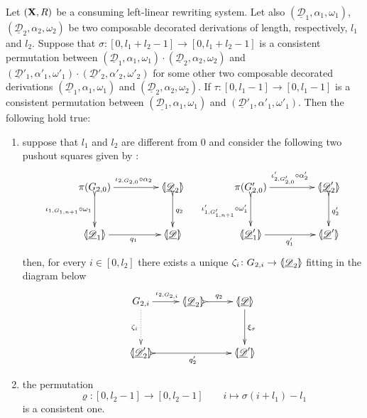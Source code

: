 \documentclass[a4paper,UKenglish,cleveref,pdftex,thm-restate,numberwithinsect]{lipics-v2021}
\def\R{\mathsf{R}}
\def\X{\textbf {\textup{X}}}
\newcommand{\dder}[1]{\mathscr{#1}}
\newcommand{\der}[1]{\underline{\dder{#1}}}
\newcommand{\lpro}{\langle \hspace{-1.85pt}[}
\newcommand{\rpro}{]\hspace{-1.85pt}\rangle}
\newcommand{\tpro}[1]{\lpro \der{#1}\rpro}
\begin{document}
\begin{lemma}\label{lem:presuffix} Let $(\X, \R)$ be a consuming
  left-linear rewriting system.  Let also
  $(\der{D}_1, \alpha_1, \omega_1)$, $(\der{D}_2, \alpha_2, \omega_2)$
  be two composable decorated derivations of length, respectively,
  $l_1$ and $l_2$. Suppose that
  $\sigma\colon [0, l_1+l_2-1]\to [0, l_1+l_2-1]$ is a consistent
  permutation between
  $(\der{D}_1, \alpha_1, \omega_1)\cdot (\der{D}_2, \alpha_2,
  \omega_2)$ and
  $(\der{D}'_1, \alpha'_1, \omega'_1)\cdot (\der{D}'_2, \alpha'_2,
  \omega'_2)$ for some other two composable decorated derivations
  $(\der{D}_1, \alpha_1, \omega_1)$ and
  $(\der{D}_2, \alpha_2, \omega_2)$.  If
  $\tau\colon [0,l_1-1]\to [0, l_1-1]$ is a consistent permutation
  between $(\der{D_1}, \alpha_1, \omega_1)$ and
  $(\der{D}'_1, \alpha'_1, \omega'_1)$. Then the following hold true:
  \begin{enumerate}
  \item suppose that $l_1$ and $l_2$ are different from $0$ and
    consider the following two pushout squares given by
    :
    \[\xymatrix@C=45pt@R=30pt{\pi(G_{2,0}) \ar@{>->}[d]_{\iota_{1,
            G_{1,n+1}} \circ \omega_1}\ar[r]^{\iota_{2, G_{2,0}} \circ
          \alpha_2}& \lpro \der{D}_2 \rpro \ar@{>->}[d]^{q_2} &
        \pi(G'_{2,0}) \ar@{>->}[d]_{\iota'_{1, G'_{1,n+1}} \circ
          \omega'_1} \ar[r]^{\iota'_{2, G'_{2,0}} \circ \alpha'_2}&
        \lpro \der{D}'_2 \rpro \ar@{>->}[d]^{q'_2} \\ \lpro \der{D}_1
        \rpro \ar[r]_{q_1} & \tpro{D} & \lpro \der{D}'_1\rpro
        \ar[r]_{q'_1} & \lpro \der{D}'\rpro }\] then, for every
    $i\in [0, l_2]$ there exists a unique
    $\zeta_i\colon G_{2,i}\to \lpro \der{D}_2\rpro $ fitting in the
    diagram below
    \[\xymatrix@R=35pt{G_{2,i} \ar[r]^{\iota_{2,G_{2,i}}} \ar@{.>}[d]_{\zeta_i}&\lpro \der{D}_2 \rpro \ar@{>->}[r]^{q_2}& \tpro{D} \ar[d]^{\xi_{\sigma}} \\
        \lpro \der{D}'_2 \rpro \ar@{>->}[rr]_{q'_2}&& \lpro
        \der{D}'\rpro }\]
  \item the permutation
    \[\varrho\colon [0,l_2-1]\to [0, l_2-1] \qquad i \mapsto
      \sigma(i+l_1)-l_1\] is a consistent one.
  \end{enumerate}
\end{lemma}
\end{document}
